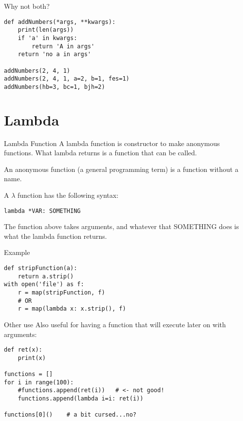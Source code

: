 \begin{frame}[containsverbatim]{Why not both?}
    \begin{verbatim}
def addNumbers(*args, **kwargs):
    print(len(args))
    if 'a' in kwargs:
        return 'A in args'
    return 'no a in args'

addNumbers(2, 4, 1)
addNumbers(2, 4, 1, a=2, b=1, fes=1)
addNumbers(hb=3, bc=1, bjh=2)
  \end{verbatim}
\end{frame}

\section{Lambda}
\begin{frame}[fragile]{Lambda Function}
  A lambda function is constructor to make anonymous functions. What lambda returns is a function that can be called.

  An anonymous function (a general programming term) is a function without a name.\pause

  A $\lambda$ function has the following syntax:
  \begin{verbatim}
lambda *VAR: SOMETHING
  \end{verbatim}
  The function above takes arguments, and whatever that SOMETHING does is what the lambda function returns.
\end{frame}

\begin{frame}[containsverbatim]{Example}
\begin{verbatim}
def stripFunction(a):
    return a.strip()
with open('file') as f:
    r = map(stripFunction, f)
    # OR
    r = map(lambda x: x.strip(), f)
\end{verbatim}
\end{frame}

\begin{frame}[containsverbatim]{Other use}
  Also useful for having a function that will execute later on with arguments:
    \begin{verbatim}
def ret(x):
    print(x)

functions = []
for i in range(100):
    #functions.append(ret(i))   # <- not good!
    functions.append(lambda i=i: ret(i))

functions[0]()    # a bit cursed...no?
  \end{verbatim}
\end{frame}

